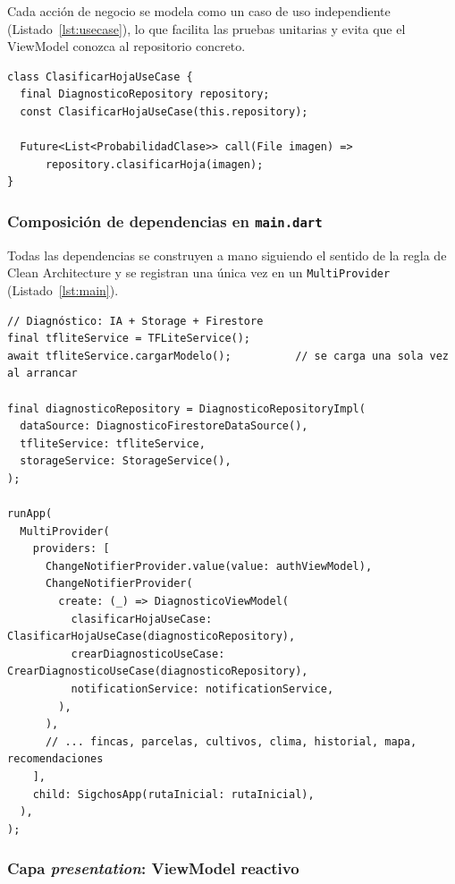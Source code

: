 \documentclass[12pt,a4paper]{article}
\begin{document}
Cada acción de negocio se modela como un caso de uso independiente
(Listado~\ref{lst:usecase}), lo que facilita las pruebas unitarias y evita que
el ViewModel conozca al repositorio concreto.

\begin{lstlisting}[caption={Caso de uso: clasificar una hoja}, label={lst:usecase}]
class ClasificarHojaUseCase {
  final DiagnosticoRepository repository;
  const ClasificarHojaUseCase(this.repository);

  Future<List<ProbabilidadClase>> call(File imagen) =>
      repository.clasificarHoja(imagen);
}
\end{lstlisting}

\subsubsection{Composición de dependencias en \texttt{main.dart}}

Todas las dependencias se construyen a mano siguiendo el sentido de la regla de
Clean Architecture y se registran una única vez en un \texttt{MultiProvider}
(Listado~\ref{lst:main}).

\begin{lstlisting}[caption={Composición manual de dependencias (fragmento de \texttt{main.dart})}, label={lst:main}]
// Diagnóstico: IA + Storage + Firestore
final tfliteService = TFLiteService();
await tfliteService.cargarModelo();          // se carga una sola vez al arrancar

final diagnosticoRepository = DiagnosticoRepositoryImpl(
  dataSource: DiagnosticoFirestoreDataSource(),
  tfliteService: tfliteService,
  storageService: StorageService(),
);

runApp(
  MultiProvider(
    providers: [
      ChangeNotifierProvider.value(value: authViewModel),
      ChangeNotifierProvider(
        create: (_) => DiagnosticoViewModel(
          clasificarHojaUseCase: ClasificarHojaUseCase(diagnosticoRepository),
          crearDiagnosticoUseCase: CrearDiagnosticoUseCase(diagnosticoRepository),
          notificationService: notificationService,
        ),
      ),
      // ... fincas, parcelas, cultivos, clima, historial, mapa, recomendaciones
    ],
    child: SigchosApp(rutaInicial: rutaInicial),
  ),
);
\end{lstlisting}

\subsubsection{Capa \textit{presentation}: ViewModel reactivo}
\end{document}

